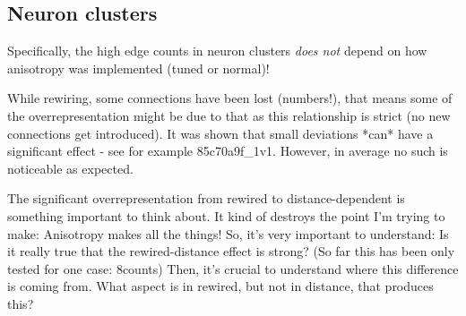 
\subsection*{Neuron clusters}





Specifically, the high edge counts in neuron clusters \textit{does
  not} depend on how anisotropy was implemented (tuned or normal)!

While rewiring, some connections have been lost (numbers!), that means
some of the overrepresentation might be due to that as this
relationship is strict (no new connections get introduced). It was
shown that small deviations *can* have a significant effect - see for
example 85c70a9f\_1v1. However, in average no such is noticeable as
expected. 

The significant overrepresentation from rewired to distance-dependent
is something important to think about. It kind of destroys the point
I'm trying to make: Anisotropy makes all the things! So, it's very
important to understand: Is it really true that the rewired-distance
effect is strong? (So far this has been only tested for one case:
8counts) Then, it's crucial to understand where this difference is
coming from. What aspect is in rewired, but not in distance, that
produces this?
